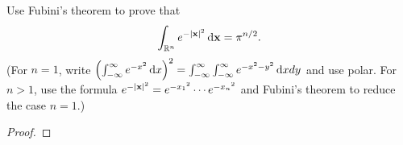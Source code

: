 \begin{problem}
Use Fubini's theorem to prove that
\[
\int_{\mathbb{R}^n}e^{-|\mathbf{x}|^2}\mathop{}\!\mathrm{d}\mathbf{x}=\pi^{n/2}.
\]
(For $n=1$, write $\left(\int_{-\infty}^\infty
e^{-x^2}\mathop{}\!\mathrm{d} x\right)^2=\int_{-\infty}^\infty\int_{-\infty}^\infty
e^{-x^2-y^2}\mathop{}\!\mathrm{d} xdy$
and use polar. For $n>1$, use the formula $e^{-|\mathbf{x}|^2}=e^{-{x_1}^2}\cdots
e^{-{x_n}^2}$ and Fubini's theorem to reduce the case $n=1$.)
\end{problem}
\begin{proof}
\end{proof}

